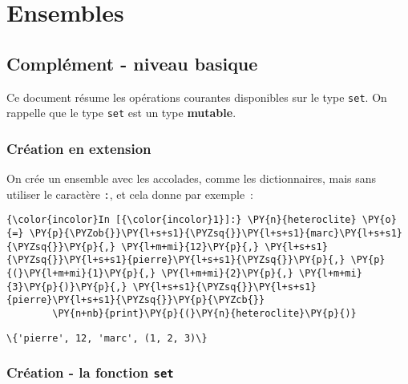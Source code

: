     \hypertarget{ensembles}{%
\section{Ensembles}\label{ensembles}}

    \hypertarget{compluxe9ment---niveau-basique}{%
\subsection{Complément - niveau
basique}\label{compluxe9ment---niveau-basique}}

    Ce document résume les opérations courantes disponibles sur le type
\texttt{set}. On rappelle que le type \texttt{set} est un type
\textbf{mutable}.

    \hypertarget{cruxe9ation-en-extension}{%
\subsubsection{Création en extension}\label{cruxe9ation-en-extension}}

    On crée un ensemble avec les accolades, comme les dictionnaires, mais
sans utiliser le caractère \texttt{:}, et cela donne par exemple~:

    \begin{Verbatim}[commandchars=\\\{\}]
{\color{incolor}In [{\color{incolor}1}]:} \PY{n}{heteroclite} \PY{o}{=} \PY{p}{\PYZob{}}\PY{l+s+s1}{\PYZsq{}}\PY{l+s+s1}{marc}\PY{l+s+s1}{\PYZsq{}}\PY{p}{,} \PY{l+m+mi}{12}\PY{p}{,} \PY{l+s+s1}{\PYZsq{}}\PY{l+s+s1}{pierre}\PY{l+s+s1}{\PYZsq{}}\PY{p}{,} \PY{p}{(}\PY{l+m+mi}{1}\PY{p}{,} \PY{l+m+mi}{2}\PY{p}{,} \PY{l+m+mi}{3}\PY{p}{)}\PY{p}{,} \PY{l+s+s1}{\PYZsq{}}\PY{l+s+s1}{pierre}\PY{l+s+s1}{\PYZsq{}}\PY{p}{\PYZcb{}}
        \PY{n+nb}{print}\PY{p}{(}\PY{n}{heteroclite}\PY{p}{)}
\end{Verbatim}


    \begin{Verbatim}[commandchars=\\\{\}]
\{'pierre', 12, 'marc', (1, 2, 3)\}

    \end{Verbatim}

    \hypertarget{cruxe9ation---la-fonction-set}{%
\subsubsection{\texorpdfstring{Création - la fonction
\texttt{set}}{Création - la fonction set}}\label{cruxe9ation---la-fonction-set}}

